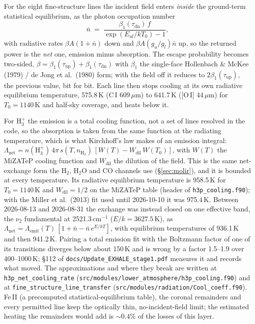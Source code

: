 \documentclass[english,a4paper]{my_memo}
\begin{document}
For the eight fine-structure lines the incident field enters \emph{inside} the
ground-term statistical equilibrium, as the photon occupation number
\begin{equation}
  \bar n \;=\; \frac{\beta_1(\tau_\mathrm{dn})\,f}{\exp(E_{ul}/kT_0)-1},
\end{equation}
with radiative rates $\beta A(1+\bar n)$ down and $\beta A (g_u/g_l)\bar n$ up, so
the returned power is the \emph{net} one, emission minus absorption. The escape
probability becomes two-sided, $\beta=\beta_1(\tau_\mathrm{up})+
\beta_1(\tau_\mathrm{dn})$ with $\beta_1$ the single-face Hollenbach \& McKee
(1979) / de Jong et al.\ (1980) form; with the field off it reduces to
$2\beta_1(\tau_\mathrm{up})$, the previous value, bit for bit. Each line then
stops cooling at its own radiative equilibrium temperature, 575.8\,K (C\,I
609\,$\mu$m) to 641.7\,K ([O\,I] 44\,$\mu$m) for $T_0=1140$\,K and half-sky
coverage, and heats below it.

For H$_3^+$ the emission is a total cooling function, not a set of lines resolved in the
code, so the absorption is taken from the same function at the radiating temperature, which
is what Kirchhoff's law makes of an emission integral:
$\Lambda_\mathrm{net}=n(\mathrm{H_3^+})\,4\pi\,s(T,n_{\mathrm{H_2}})
\,[W(T)-W_\mathrm{dil}\,W(T_0)]$, with $W(T)$ the MiZATeP cooling function and
$W_\mathrm{dil}$ the dilution of the field. This is the same net-exchange form the H$_2$,
H$_2$O and CO channels use (\S\ref{sec:molir}), and it is bounded at every temperature. Its
radiative equilibrium temperature is 958.5\,K for $T_0=1140$\,K and $W_\mathrm{dil}=1/2$
on the MiZATeP table (header of \texttt{h3p\_cooling.f90}); with the Miller et al.\ (2013)
fit used until 2026-10-10 it was 975.4\,K.
Between 2026-08-13 and 2026-08-31 the exchange was instead closed on one
effective band, the $\nu_2$ fundamental at 2521.3\,cm$^{-1}$ ($E/k=3627.5$\,K),
as $\Lambda_\mathrm{net}=\Lambda_\mathrm{emit}(T)\,[1+\bar n-\bar n\,e^{E/kT}]$,
with equilibrium temperatures of 936.1\,K and then 941.2\,K. Pairing a total
emission fit with the Boltzmann factor of one of its transitions diverges below
about 150\,K and is wrong by a factor 1.5--1.9 over 400--1000\,K; \S112 of
\texttt{docs/Update\_EXHALE\_stage1.pdf} measures it and records what moved.
The approximations and where they break are written at
\texttt{h3p\_net\_cooling\_rate}
(\texttt{src/modules/lower\_atmosphere/h3p\_cooling.f90}) and at
\texttt{fine\_structure\_line\_transfer}
(\texttt{src/modules/radiation/Cool\_coeff.f90}). Fe\,II (a precomputed
statistical-equilibrium table), the coronal remainders and every permitted line
keep the optically thin, no-incident-field limit; the estimated heating the
remainders would add is ${\sim}0.4\%$ of the losses of this layer.
\end{document}
